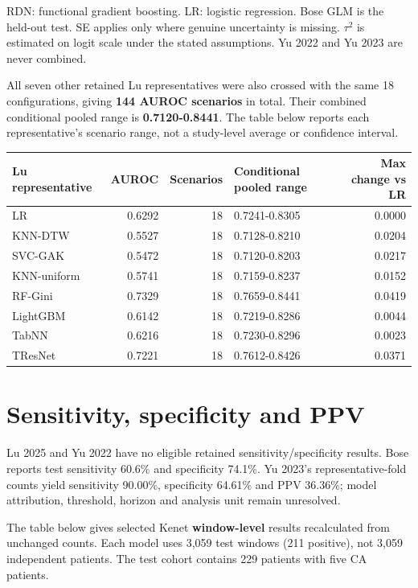 \documentclass[10pt,a4paper]{article}
\begin{document}
{\small RDN: functional gradient boosting. LR: logistic regression. Bose GLM is the held-out test. SE applies only where genuine uncertainty is missing. $\tau^2$ is estimated on logit scale under the stated assumptions. Yu 2022 and Yu 2023 are never combined.}

All seven other retained Lu representatives were also crossed with the same 18 configurations, giving \textbf{144 AUROC scenarios} in total. Their combined conditional pooled range is \textbf{0.7120-0.8441}. The table below reports each representative's scenario range, not a study-level average or confidence interval.

\begin{center}\small
\begin{tabularx}{\textwidth}{l r r X r}
\toprule Lu representative & AUROC & Scenarios & Conditional pooled range & Max change vs LR \\
\midrule
LR & 0.6292 & 18 & 0.7241-0.8305 & 0.0000 \\
KNN-DTW & 0.5527 & 18 & 0.7128-0.8210 & 0.0204 \\
SVC-GAK & 0.5472 & 18 & 0.7120-0.8203 & 0.0217 \\
KNN-uniform & 0.5741 & 18 & 0.7159-0.8237 & 0.0152 \\
RF-Gini & 0.7329 & 18 & 0.7659-0.8441 & 0.0419 \\
LightGBM & 0.6142 & 18 & 0.7219-0.8286 & 0.0044 \\
TabNN & 0.6216 & 18 & 0.7230-0.8296 & 0.0023 \\
TResNet & 0.7221 & 18 & 0.7612-0.8426 & 0.0371 \\
\bottomrule
\end{tabularx}\end{center}
\newpage
\section*{Sensitivity, specificity and PPV}
Lu 2025 and Yu 2022 have no eligible retained sensitivity/specificity results. Bose reports test sensitivity 60.6\% and specificity 74.1\%. Yu 2023's representative-fold counts yield sensitivity 90.00\%, specificity 64.61\% and PPV 36.36\%; model attribution, threshold, horizon and analysis unit remain unresolved.

The table below gives selected Kenet \textbf{window-level} results recalculated from unchanged counts. Each model uses 3,059 test windows (211 positive), not 3,059 independent patients. The test cohort contains 229 patients with five CA patients.
\end{document}
